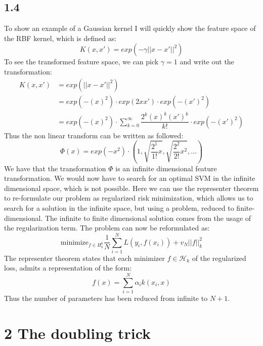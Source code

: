 \documentclass{article}
\begin{document}
\subsection{1.4}
To show an example of a Gaussian kernel I will quickly show the feature space of the RBF kernel, which is defined as:
\begin{equation}
K(x,x') = exp(-\gamma || x - x'||^2)
\end{equation}
To see the transformed feature space, we can pick $\gamma=1$ and write out the transformation:
\begin{align}
K(x,x') &= exp(|| x - x'||^2) \\
&= exp(-(x)^2) \cdot exp(2xx') \cdot exp(-(x')^2) \\
&= exp(-(x)^2) \cdot \sum\limits_{k=0}^\infty \dfrac{2^k(x)^k(x')^k}{k!} \cdot exp(-(x')^2)
\end{align}
Thus the non linear transform can be written as followed:
\begin{equation}
\Phi(x) = exp(-x^2) \cdot \left( 1, \sqrt{\dfrac{2^1}{1!}x}, \sqrt{\dfrac{2^2}{2!}x^2}, \dots \right)
\end{equation}
We have that the transformation $\Phi$ is an infinite dimensional feature transformation. We would now have to search for an optimal SVM in the infinite dimensional space, which is not possible. Here we can use the representer theorem to re-formulate our problem as regularized risk minimization, which allows us to search for a solution in the infinite space, but using a problem, reduced to finite-dimensional. The infinite to finite dimensional solution comes from the usage of the regularization term. The problem can now be reformulated as:
\begin{equation}
\text{minimize}_{f\in H_k^b} \dfrac{1}{N} \sum\limits_{i=1}^N L(y_i, f(x_i)) + v_N ||f||^2_k
\end{equation}
The representer theorem states that each minimizer $f\in \mathcal{H}_k$ of the regularized loss, admits a representation of the form:
\begin{equation}
f(x) = \sum\limits_{i=1}^N \alpha_i k(x_i,x)
\end{equation}
Thus the number of parameters has been reduced from infinite to $N+1$.
\section{2 The doubling trick}
\end{document}
